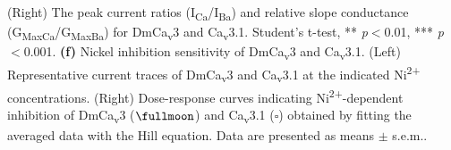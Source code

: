 (Right) The peak current ratios (I\textsubscript{Ca}/I\textsubscript{Ba}) and relative slope conductance (G\textsubscript{MaxCa}/G\textsubscript{MaxBa}) for DmCa\textsubscript{v}3 and Ca\textsubscript{v}3.1.
Student's t-test, ** \emph{p}$<$0.01, *** \emph{p}$<$0.001.
\textbf{(f)} Nickel inhibition sensitivity of DmCa\textsubscript{v}3 and Ca\textsubscript{v}3.1. 
(Left) Representative current traces of DmCa\textsubscript{v}3 and Ca\textsubscript{v}3.1 at the indicated Ni\textsuperscript{2+} concentrations. 
(Right) Dose-response curves indicating Ni\textsuperscript{2+}-dependent inhibition of DmCa\textsubscript{v}3 ($\fullmoon$) and Ca\textsubscript{v}3.1 ($\square$) obtained by fitting the averaged data with the Hill equation.
Data are presented as means $\pm$ s.e.m..
